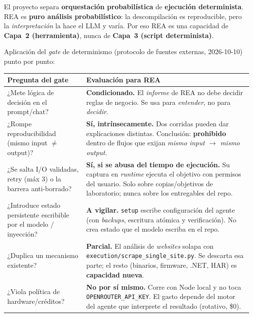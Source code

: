 \documentclass[11pt,a4paper]{article}
\begin{document}
\begin{tcolorbox}[tarjetaIcono, title={\faIcon{check-circle}~Principio rector}]
El proyecto separa \textbf{orquestación probabilística} de \textbf{ejecución determinista}.
REA es \textbf{puro análisis probabilístico}: la descompilación es reproducible, pero la
\emph{interpretación} la hace el LLM y varía. Por eso REA es una capacidad de
\textbf{Capa~2 (herramienta)}, nunca de \textbf{Capa~3 (script determinista)}.
\end{tcolorbox}

Aplicación del \emph{gate} de determinismo (protocolo de fuentes externas, 2026-10-10)
punto por punto:

\begin{longtable}{p{6.2cm} p{8.0cm}}
\toprule
\textbf{Pregunta del gate} & \textbf{Evaluación para REA} \\
\midrule
\endhead
\bottomrule
\endlastfoot
¿Mete lógica de decisión en el prompt/chat? &
\textbf{Condicionado.} El \emph{informe} de REA no debe decidir reglas de negocio. Se usa
para \emph{entender}, no para \emph{decidir}. \\
\addlinespace
¿Rompe reproducibilidad (mismo input \(\neq\) output)? &
\textbf{Sí, intrínsecamente.} Dos corridas pueden dar explicaciones distintas. Conclusión:
\textbf{prohibido} dentro de flujos que exijan \emph{mismo input \(\rightarrow\) mismo
output}. \\
\addlinespace
¿Se salta I/O validadas, retry (máx 3) o la barrera anti-borrado? &
\textbf{Sí, si se abusa del tiempo de ejecución.} Su captura en \emph{runtime} ejecuta el
objetivo con permisos del usuario. Solo sobre copias/objetivos de laboratorio; nunca sobre
los entregables del repo. \\
\addlinespace
¿Introduce estado persistente escribible por el modelo / inyección? &
\textbf{A vigilar.} \texttt{setup} escribe configuración del agente (con \emph{backups},
escritura atómica y verificación). No crea estado que el modelo escriba en el repo. \\
\addlinespace
¿Duplica un mecanismo existente? &
\textbf{Parcial.} El análisis de \emph{websites} solapa con
\texttt{execution/scrape\_single\_site.py}. Se descarta esa parte; el resto (binarios,
firmware, .NET, HAR) es \textbf{capacidad nueva}. \\
\addlinespace
¿Viola política de hardware/créditos? &
\textbf{No por sí mismo.} Corre con Node local y no toca \texttt{OPENROUTER\_API\_KEY}.
El gasto depende del motor del agente que interprete el resultado (rotativo, \$0). \\
\end{longtable}
\end{document}
